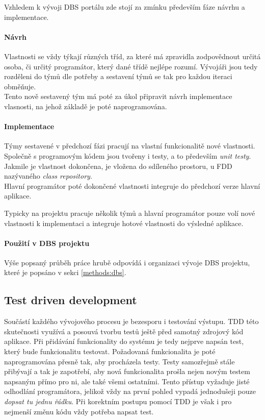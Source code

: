 Vzhledem k vývoji DBS portálu zde stojí za zmínku především fáze návrhu a implementace.

\paragraph{Návrh}
Vlastnosti se vždy týkají různých tříd, za které má zpravidla zodpovědnout určitá osoba, či určitý programátor, který dané třídě nejlépe rozumí. Vývojáři jsou tedy rozděleni do týmů dle potřeby a sestavení týmů se tak pro každou iteraci obměňuje.\\
Tento nově sestavený tým má poté za úkol připravit návrh implementace vlasnosti, na jehož základě je poté naprogramována.

\paragraph{Implementace}
Týmy sestavené v předchozí fázi pracují na vlastní funkcionalitě nové vlastnosti. Společně s programovým kódem jsou tvořeny i testy, a to především \emph{unit testy}.\\
Jakmile je vlastnost dokončena, je vložena do sdíleného prostoru, u FDD nazývaného \emph{class repository}.\\
Hlavní programátor poté dokončené vlastnosti integruje do předchozí verze hlavní aplikace.

Typicky na projektu pracuje několik týmů a hlavní programátor pouze volí nové vlastnosti k implementaci a integruje hotové vlastnosti do výsledné aplikace.

\paragraph{Použití v DBS projektu}
Výše popsaný průběh práce hrubě odpovídá i organizaci vývoje DBS projektu, které je popsáno v sekci \ref{methods:dbs}.


\subsection{Test driven development} \label{methods:tdd}

Součástí každého vývojového procesu je bezesporu i testování výstupu. TDD této skutečnosti využívá a posouvá tvorbu testů ještě před samotný zdrojový kód aplikace. Při přidávání funkcionality do systému je tedy nejprve napsán test, který bude funkcionalitu testovat. Požadovaná funkcionalita je poté naprogramována přesně tak, aby procházela testy. Testy samozřejmě stále přibývají a tak je zapotřebí, aby nová funkcionalita prošla nejen novým testem napsaným přímo pro ni, ale také všemi ostatními.
Tento přístup vyžaduje jisté odhodlání programátora, jelikož vždy na první pohled vypadá jednodušeji pouze \emph{dopsat tu jednu řádku}. Při korektním postupu pomocí TDD je však i pro nejmenší změnu kódu vždy potřeba napsat test.

